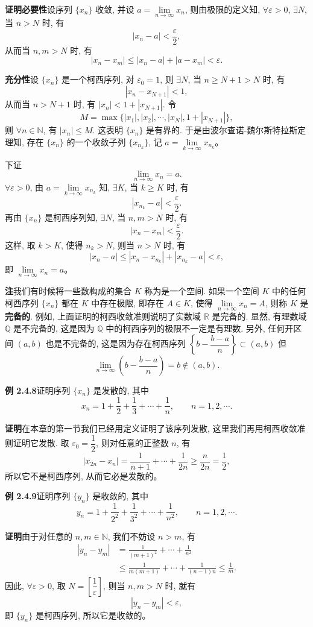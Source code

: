 \documentclass[UTF8, 12pt, fontset=fandol, oneside]{ctexart}
\begin{document}
\noindent\textbf{证明}\quad \textbf{必要性}\quad 设序列 $\{x_n\}$ 收敛, 并设 $a=\lim\limits_{n\to\infty}x_n$, 则由极限的定义知, $\forall\varepsilon>0$, $\exists N$, 当 $n>N$ 时, 有
\[
  |x_n-a|<\frac\varepsilon2,
\]
从而当 $n,m>N$ 时, 有
\[
  |x_n-x_m|\leqslant |x_n-a|+|a-x_m|<\varepsilon.
\]

\textbf{充分性}\quad 设 $\{x_n\}$ 是一个柯西序列, 对 $\varepsilon_0=1$, 则 $\exists N$, 当 $n\geqslant N+1>N$ 时, 有
\[
  |x_n-x_{N+1}|<1,
\]
从而当 $n>N+1$ 时, 有 $|x_n|<1+|x_{N+1}|$. 令
\[
  M=\max\{|x_1|,|x_2|,\cdots,|x_N|,1+|x_{N+1}|\},
\]
则 $\forall n\in\mathbb{N}$, 有 $|x_n|\leqslant M$. 这表明 $\{x_n\}$ 是有界的. 于是由波尔查诺-魏尔斯特拉斯定理知, 存在 $\{x_n\}$ 的一个收敛子列 $\{x_{n_k}\}$, 记 $a=\lim\limits_{k\to\infty}x_{n_k}$。

下证
\[
  \lim_{n\to\infty}x_n=a.
\]
$\forall\varepsilon>0$, 由 $a=\lim\limits_{k\to\infty}x_{n_k}$ 知, $\exists K$, 当 $k\geqslant K$ 时, 有
\[
  |x_{n_k}-a|<\frac\varepsilon2.
\]
再由 $\{x_n\}$ 是柯西序列知, $\exists N$, 当 $n,m>N$ 时, 有
\[
  |x_n-x_m|<\frac\varepsilon2.
\]
这样, 取 $k>K$, 使得 $n_k>N$, 则当 $n>N$ 时, 有
\[
  |x_n-a|\leqslant |x_n-x_{n_k}|+|x_{n_k}-a|<\varepsilon,
\]
即 $\lim\limits_{n\to\infty}x_n=a$。

\noindent\textbf{注}\quad 我们有时候将一些数构成的集合 $K$ 称为是一个空间. 如果一个空间 $K$ 中的任何柯西序列 $\{x_n\}$ 都在 $K$ 中存在极限, 即存在 $A\in K$, 使得 $\lim\limits_{n\to\infty}x_n=A$, 则称 $K$ 是\textbf{完备的}. 例如, 上面证明的柯西收敛准则说明了实数域 $\mathbb{R}$ 是完备的. 显然, 有理数域 $\mathbb{Q}$ 是不完备的, 这是因为 $\mathbb{Q}$ 中的柯西序列的极限不一定是有理数. 另外, 任何开区间 $(a,b)$ 也是不完备的, 这是因为存在柯西序列 $\left\{b-\dfrac{b-a}{n}\right\}\subset(a,b)$ 但
\[
  \lim_{n\to\infty}\left(b-\frac{b-a}{n}\right)=b\notin(a,b).
\]

\noindent\textbf{例 2.4.8}\quad 证明序列 $\{x_n\}$ 是发散的, 其中
\[
  x_n=1+\frac12+\frac13+\cdots+\frac1n,\qquad n=1,2,\cdots.
\]

\noindent\textbf{证明}\quad 在本章的第一节我们已经用定义证明了该序列发散, 这里我们再用柯西收敛准则证明它发散. 取 $\varepsilon_0=\dfrac12$, 则对任意的正整数 $n$, 有
\[
  |x_{2n}-x_n|
  =
  \frac1{n+1}+\cdots+\frac1{2n}
  \geqslant \frac n{2n}=\frac12,
\]
所以它不是柯西序列, 从而它必是发散的。

\noindent\textbf{例 2.4.9}\quad 证明序列 $\{y_n\}$ 是收敛的, 其中
\[
  y_n=1+\frac1{2^2}+\frac1{3^2}+\cdots+\frac1{n^2},\qquad n=1,2,\cdots.
\]

\noindent\textbf{证明}\quad 由于对任意的 $n,m\in\mathbb{N}$, 我们不妨设 $n>m$, 有
\[
\begin{aligned}
  |y_n-y_m|
  &=
  \frac1{(m+1)^2}+\cdots+\frac1{n^2}\\
  &\leqslant
  \frac1{m(m+1)}+\cdots+\frac1{(n-1)n}
  \leqslant \frac1m.
\end{aligned}
\]
因此, $\forall\varepsilon>0$, 取 $N=\left[\dfrac1\varepsilon\right]$, 则当 $n,m>N$ 时, 就有
\[
  |y_n-y_m|<\varepsilon,
\]
即 $\{y_n\}$ 是柯西序列, 所以它是收敛的。
\end{document}
